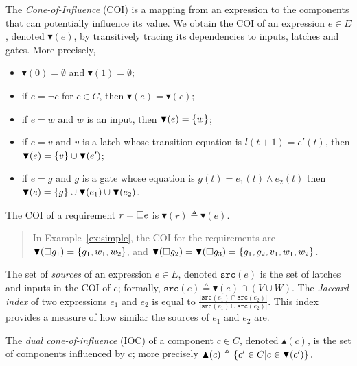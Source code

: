 {The \emph{Cone-of-Influence} (COI) is a mapping from an expression to the components that can potentially influence its value. We obtain the COI of an expression $e \in E$, denoted $\blacktriangledown(e)$, by transitively tracing its dependencies to inputs, latches and gates. More precisely, 
\begin{itemize}
\item $\blacktriangledown(0)=\emptyset$ and $\blacktriangledown(1)=\emptyset$;
\item if $e=\lnot c$ for $c \in C$, then $\blacktriangledown(e)= \blacktriangledown(c)$;
\item if $e=w$ and $w$ is an input, then $\blacktriangledown(e)=\left\{w\right\}$;
\item if $e=v$ and $v$ is a latch whose transition equation is $l(t+1) = e'(t)$, then $\blacktriangledown(e)=\left\{v\right\} \cup \blacktriangledown(e')$;
\item if $e=g$ and $g$ is a gate whose equation is $g(t) = e_1(t) \land e_2(t)$ then $\blacktriangledown(e)=\left\{g\right\} \cup \blacktriangledown(e_1)\cup \blacktriangledown(e_2)$.
\end{itemize}
The COI of a requirement $r={{\square}} e$ is $\blacktriangledown(r)\triangleq \blacktriangledown(e)$.

\begin{quote}
In Example~\ref{ex:simple}, the COI for the requirements are $\blacktriangledown({{\square}} g_1)=\left\{g_1,w_1,w_2\right\}$, and $\blacktriangledown({{\square}} g_2)=\blacktriangledown({{\square}} g_3)=\left\{g_1,g_2,v_1,w_1,w_2\right\}$.
\end{quote}

The set of \emph{sources} of an expression $e\in E$, denoted $\mathtt{src}(e)$ is the set of latches and inputs in the COI of $e$; formally, $\mathtt{src}(e)\triangleq \blacktriangledown(e) \cap (V \cup W)$. The \emph{Jaccard index} of two expressions $e_1$ and $e_2$ is equal to $
\frac{|\mathtt{src}(e_1)\cap \mathtt{src}(e_2)|}{|\mathtt{src}(e_1)\cup\mathtt{src}(e_2)|}
$. This index provides a measure of how similar the sources of $e_1$ and $e_2$ are. 

The \emph{dual cone-of-influence} (IOC) of a component $c \in C$, denoted $\blacktriangle(c)$, is the set of components influenced by $c$; more precisely 
$\blacktriangle(c) \triangleq \left\{c' \in  C | c\in \blacktriangledown(c')\right\}.$

}
